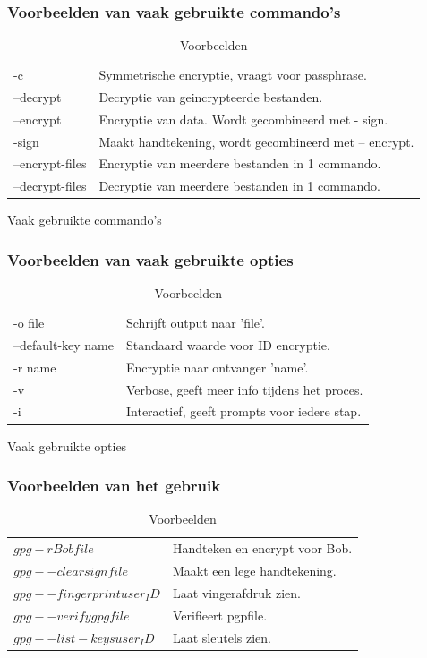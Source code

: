 \documentclass[12pt]{article}
\begin{document}
				\subsubsection{Voorbeelden van vaak gebruikte commando's}\label{com}
					\begin{table}[!ht]
						\begin{tabular}{l|l}
								-c				&	Symmetrische encryptie, vraagt voor 																	passphrase.\\
								--decrypt			&	Decryptie van geincrypteerde bestanden.\\
								--encrypt			&	Encryptie van data. Wordt gecombineerd met -															sign.\\
								-sign				&	Maakt handtekening, wordt gecombineerd met --															encrypt.\\
								--encrypt-files	&	Encryptie van meerdere bestanden in 1 																	commando.\\
								--decrypt-files	&	Decryptie van meerdere bestanden in 1 																	commando.\\
						\end{tabular}
						\caption{Vaak gebruikte commando's}						
					
				\subsubsection{Voorbeelden van vaak gebruikte opties}\label{opt}					
						\begin{tabular}{l|l}
								-o file				&	Schrijft output naar 'file'.\\
								--default-key name	&	Standaard waarde voor ID encryptie.\\
								-r name				&	Encryptie naar ontvanger 'name'.\\
								-v					&	Verbose, geeft meer info tijdens het 																	proces.\\
								-i					&	Interactief, geeft prompts voor iedere 																	stap.\\
						\end{tabular}\caption{Vaak gebruikte opties}
											
				\subsubsection{Voorbeelden van het gebruik}\label{use}
						\begin{tabular}{l|l}
								$gpg -r Bob file$				&	Handteken en encrypt voor Bob.\\
								$gpg --clearsign file$			&	Maakt een lege handtekening.\\
								$gpg --fingerprint user_ID$		&	Laat vingerafdruk zien.\\
								$gpg --verify gpgfile$			&	Verifieert pgpfile.\\
								$gpg --list-keys user_ID$		&	Laat sleutels zien.\\
						\end{tabular}
						\caption{Voorbeelden}
					\end{table}	
			
\end{document}
